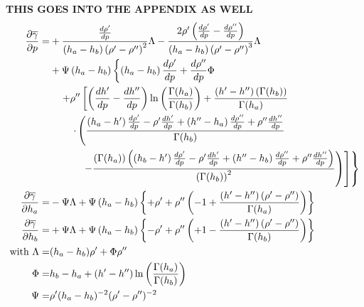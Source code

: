 \documentclass[11pt]{article} %
\begin{document}
\begin{sidewaysfigure}
\textbf{THIS GOES INTO THE APPENDIX AS WELL}
\begin{align}
\frac{\partial \overline{\gamma}}{\partial p} =& + {
  \frac{\frac{d\rhop}{dp}}{\left( h_a-h_b \right) \left( \rhop-\rhopp \right)^2} 
  \Lambda } - {
  \frac{2 \rhop \left( \frac{d\rhop}{dp} - \frac{d\rhopp}{dp} \right)}{\left( h_a-h_b \right) \left( \rhop-\rhopp \right)^3} 
  \Lambda } \nonumber \\
& + {\Psi\left(h_a-h_b\right) \left\lbrace{
    { \left( h_a-h_b \right) {\frac{d\rhop}{dp} } } + \frac{d\rhopp}{dp} 
  \Phi }\right. } \nonumber \\
& \quad \left.{ + \rhopp \left[{
  \left({ \frac {d\hp}{dp} - \frac{d\hpp}{dp} }\right) \ln \left({ \frac{\Gamma(h_a)}{\Gamma(h_b)} }\right)
  + \frac{\left( \hp-\hpp \right) \left( \Gamma(h_b)  \right) }
      { \Gamma(h_a) }
}\right. }\right. \nonumber \\
& \quad \quad \left.{ \left.{ \cdot \left({
  \frac{ \left( h_a-\hp \right) \frac{d\rhop}{dp} - \rhop \frac{d\hp}{dp} 
    + \left( \hpp-h_a \right) \frac{d\rhopp}{dp} + \rhopp \frac{d\hpp}{dp}}
    {\Gamma(h_b)}
}\right.}\right.}\right. \nonumber \\ 
& \quad \quad \quad \left.{ \left.{ \left.{ -
\frac{ \left( \Gamma(h_a) \right) 
          \left( \left( h_b-\hp \right) \frac{d\rhop}{dp} - \rhop \frac{d\hp}{dp} + 
               \left( \hpp-h_b \right) \frac{d\rhopp}{dp} + \rhopp \frac{d\hpp}{dp}
          \right) 
        }{ \left( \Gamma(h_b) \right)^2 }
        } \right) 
} \right]  }\right\rbrace
%
%
\label{eqn:dgammabardpalt} \\
%
\frac{\partial \overline{\gamma}}{\partial h_a} =&
-{\Psi\Lambda} + {\Psi\left(h_a-h_b\right)\left\lbrace+\rhop+\rhopp\left(-1+{\frac{\left(\hp-\hpp\right)\left(\rhop-\rhopp\right)}{\Gamma(h_a)}}\right)\right\rbrace} \label{eqn:dgammabardhaalt} \\
%
\frac{\partial \overline{\gamma}}{\partial h_b} =&
+{\Psi\Lambda} + {\Psi\left(h_a-h_b\right)\left\lbrace-\rhop+\rhopp\left(+1-{\frac{\left(\hp-\hpp\right)\left(\rhop-\rhopp\right)}{\Gamma(h_b)}}\right)\right\rbrace}\label{eqn:dgammabardhbalt} \\
%
\text{ with } \Lambda =& (h_a-h_b)\rhop+\Phi\rhopp \\
\Phi =& h_b-h_a+(\hp-\hpp)\ln\left(\frac{\Gamma(h_a)}{\Gamma(h_b)}\right) \\
\Psi =& \rhop (h_a-h_b)^{-2} (\rhop-\rhopp)^{-2}
%
\end{align}
\end{sidewaysfigure}
\end{document}
